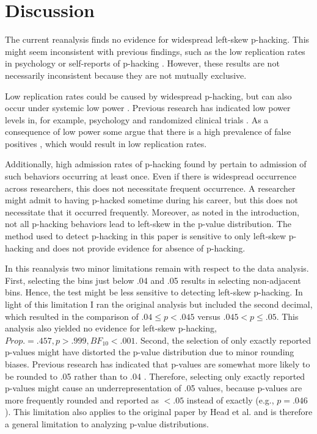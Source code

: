 \section*{Discussion} 
The current reanalysis finds no evidence for widespread left-skew p-hacking. This might seem inconsistent with previous findings, such as the low replication rates in psychology \cite{Baker_undated-qd} or self-reports of p-hacking \cite{John2012-uj}. However, these results are not necessarily inconsistent because they are not mutually exclusive. 

Low replication rates could be caused by widespread p-hacking, but can also occur under systemic low power \cite{Bakker2014-lr,Bakker_2012}. Previous research has indicated low power levels in, for example, psychology \cite{Cohen1962-jc,Sedlmeier1989-yc} and randomized clinical trials \cite{Moher1994-ra}. As a consequence of low power some argue that there is a high prevalence of false positives \cite{Ioannidis2005-am}, which would result in low replication rates.

Additionally, high admission rates of p-hacking found by \cite{John2012-uj} pertain to admission of such behaviors occurring at least once. Even if there is widespread occurrence across researchers, this does not necessitate frequent occurrence. A researcher might admit to having p-hacked sometime during his career, but this does not necessitate that it occurred frequently. Moreover, as noted in the introduction, not all p-hacking behaviors lead to left-skew in the p-value distribution. The method used to detect p-hacking in this paper is sensitive to only left-skew p-hacking and does not provide evidence for absence of p-hacking.

In this reanalysis two minor limitations remain with respect to the data analysis. First, selecting the bins just below .04 and .05 results in selecting non-adjacent bins. Hence, the test might be less sensitive to detecting left-skew p-hacking. In light of this limitation I ran the original analysis but included the second decimal, which resulted in the comparison of $.04\leq p<.045$ versus $.045<p\leq.05$. This analysis also yielded no evidence for left-skew p-hacking, $Prop.=.457,p>.999,BF_{10}<.001$. Second, the selection of only exactly reported p-values might have distorted the p-value distribution due to minor rounding biases. Previous research has indicated that p-values are somewhat more likely to be rounded to .05 rather than to .04 \cite{Krawczyk2015-uh}. Therefore, selecting only exactly reported p-values might cause an underrepresentation of .05 values, because p-values are more frequently rounded and reported as $<.05$ instead of exactly (e.g., $p=.046$). This limitation also applies to the original paper by Head et al. and is therefore a general limitation to analyzing p-value distributions.

